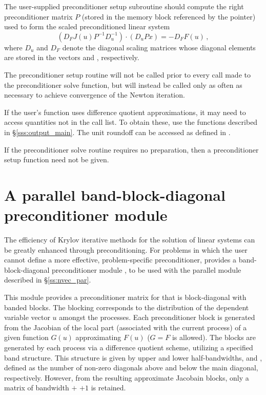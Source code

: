 {
  The user-supplied preconditioner setup subroutine should
  compute the right preconditioner matrix $P$ (stored in the memory
  block referenced by the  pointer) used to form the
  scaled preconditioned linear system
    $$(D_F J(u) P^{-1} D_u^{-1}) \cdot (D_u P x) = - D_F F(u) \, ,$$
   where $D_u$ and $D_F$ denote the diagonal scaling matrices whose
  diagonal elements are stored in the vectors  and
  , respectively.
 
  The preconditioner setup routine will not be called prior
  to every call made to the preconditioner solve function, but will instead be
  called only as often as necessary to achieve convergence of the
  Newton iteration.
 
  If the user's  function uses difference quotient approximations,
  it may need to access quantities not in the call list. To obtain these, use the
   functions described in \S\ref{sss:output_main}. The unit roundoff
  can be accessed as  defined in .


  If the preconditioner solve routine requires no preparation, then a
  preconditioner setup function need not be given.
}

\section{A parallel band-block-diagonal preconditioner module}
\label{sss:kinbbdpre}
The efficiency of Krylov iterative methods for the solution of linear systems 
can be greatly enhanced through preconditioning. For problems in which the 
user cannot define a more effective, problem-specific preconditioner,
{\kinsol} provides a band-block-diagonal preconditioner module {\kinbbdpre}, 
to be used with the parallel  module described in \S\ref{ss:nvec_par}.

This module provides a preconditioner matrix for {\kinsol} that
is block-diagonal with banded blocks. The blocking corresponds
to the distribution of the dependent variable vector $u$ amongst
the processes. Each preconditioner block is generated from
the Jacobian of the local part (associated with the current
process) of a given function $G(u)$ approximating $F(u)$
($G = F$ is allowed). The blocks are generated by each process via a
difference quotient scheme, utilizing a specified band structure.
This structure is given by upper and lower half-bandwidths, 
and , defined as the number of non-zero diagonals above and
below the main diagonal, respectively.  However, from the resulting
approximate Jacobain blocks, only a matrix of bandwidth  $+$
 $+ 1$ is retained.

